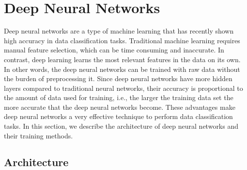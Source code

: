 \documentclass[conference]{IEEEtran}
\begin{document}
\section{Deep Neural Networks}
Deep neural networks are a type of machine learning that has recently shown high accuracy in data classification tasks. Traditional
machine learning requires manual feature selection, which can be time consuming and inaccurate. In contrast, deep learning
learns the most relevant features in the data on its own. In other words, the deep neural networks can be trained with raw data without
the burden of preprocessing it. Since deep neural networks have more hidden layers compared to traditional neural networks, their
accuracy is proportional to the amount of data used for training, i.e., the larger the training data set the more accurate that the
deep neural networks become. These advantages make deep neural networks a very effective technique to perform data classification
tasks. In this section, we describe the architecture of deep neural networks and their training methods. 


\subsection{Architecture}\label{sec:MLP}
\end{document}
